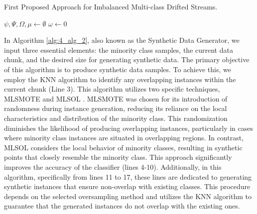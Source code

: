\begin{algorithm}[H]
\caption{First Proposed Approach for Imbalanced Multi-class Drifted Streams.}
\label{alg:4_alg_1}
\BlankLine
$\psi, \Psi, \Omega, \mu \gets \emptyset$\;
$\omega \gets 0$\;
\end{algorithm}

\vspace{1cm}

In Algorithm \ref{alg:4_alg_2}, also known as the Synthetic Data Generator, we input three essential elements: the minority class samples, the current data chunk, and the desired size for generating synthetic data. The primary objective of this algorithm is to produce synthetic data samples. To achieve this, we employ the KNN algorithm to identify any overlapping instances within the current chunk (Line 3). This algorithm utilizes two specific techniques, MLSMOTE \cite{gama2004learning} and MLSOL \cite{liu2017regional}. MLSMOTE was chosen for its introduction of randomness during instance generation, reducing its reliance on the local characteristics and distribution of the minority class. This randomization diminishes the likelihood of producing overlapping instances, particularly in cases where minority class instances are situated in overlapping regions. In contrast, MLSOL considers the local behavior of minority classes, resulting in synthetic points that closely resemble the minority class. This approach significantly improves the accuracy of the classifier (lines 4-10). Additionally, in this algorithm, specifically from lines 11 to 17, these lines are dedicated to generating synthetic instances that ensure non-overlap with existing classes. This procedure depends on the selected oversampling method and utilizes the KNN algorithm to guarantee that the generated instances do not overlap with the existing ones.
\vspace{1cm}


